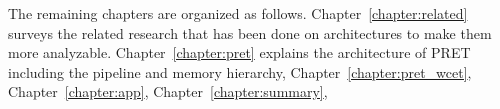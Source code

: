 
The remaining chapters are organized as follows. 
Chapter~\ref{chapter:related} surveys the related research that has been done on architectures to make them more analyzable.
Chapter~\ref{chapter:pret} explains the architecture of PRET including the \thdint pipeline and memory hierarchy, Chapter~\ref{chapter:pret_wcet}, Chapter~\ref{chapter:app}, Chapter~\ref{chapter:summary},


